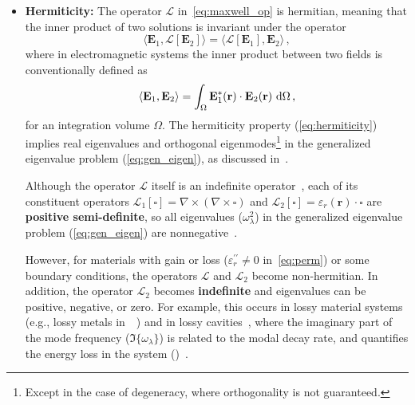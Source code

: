 \begin{itemize}
              \item \textbf{Hermiticity:} The operator $\mathcal{L}$ in~\eqref{eq:maxwell_op} is hermitian,
              meaning that the inner product of two solutions is invariant under the
              operator
                           \begin{equation}\label{eq:hermiticity}
                             \langle \mathbf{E}_1, \mathcal{L}[\mathbf{E}_2] \rangle = \langle \mathcal{L}[\mathbf{E}_1], \mathbf{E}_2 \rangle\,,
                         \end{equation}
              where in electromagnetic systems the inner product between two fields is conventionally defined as
                         \begin{equation}
                             \langle \mathbf{E}_1, \mathbf{E}_2 \rangle = \int_\Omega \mathbf{E}_1^*(\mathbf{r}) \cdot \mathbf{E}_2(\mathbf{r}) \, \mathop{}\!\text{d}\Omega\,,
                         \end{equation}
              for an integration volume $\Omega$.
              The hermiticity property (\eqref{eq:hermiticity}) implies real eigenvalues and orthogonal eigenmodes\footnote{Except in
              the case of degeneracy, where orthogonality is not guaranteed.} in the generalized eigenvalue problem (\eqref{eq:gen_eigen}), as discussed
              in~\cite{phot_crys}.
              
              Although the operator $\mathcal{L}$ itself is an indefinite operator~\cite{phot_crys}, each of its constituent operators $\mathcal{L}_1[\square]=\nabla \times (\nabla \times \square)$ and $\mathcal{L}_2[\square]=\varepsilon_r(\mathbf{r}) \cdot \square$ are \textbf{positive semi-definite}, so all
              eigenvalues ($\omega_\lambda^2$) in the generalized eigenvalue problem (\eqref{eq:gen_eigen}) are nonnegative~\cite{phot_crys}. 
              
              However, for materials with
              gain or loss
              ($\varepsilon_r^{\prime\prime} \neq 0$ in~\eqref{eq:perm}) or some boundary conditions, the operators $\mathcal{L}$ and $\mathcal{L}_2$ become non-hermitian. In addition, the operator $\mathcal{L}_2$ becomes \textbf{indefinite} and eigenvalues can be positive, negative, or zero. For example, this occurs in lossy
              material systems
              (e.g., lossy metals in~~\cite{ownpub0}) and in lossy cavities~\cite{ownpub4},
              where the imaginary part of the mode frequency ($\Im\{\omega_\lambda\}$) is
              related to the modal decay rate, and quantifies the energy loss in the system ()~\cite{ownpub0}.


\end{itemize}
